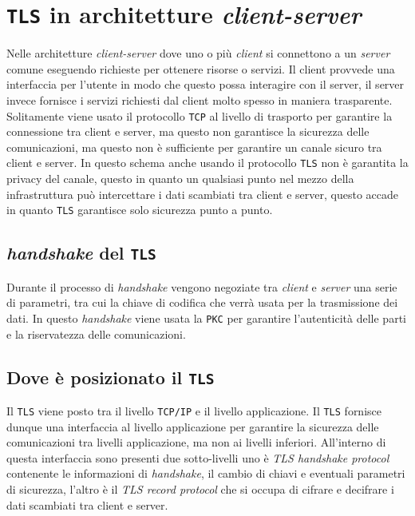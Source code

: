\section{\texttt{TLS} in architetture \textit{client-server}}
    Nelle architetture \textit{client-server} dove uno o più \textit{client} si connettono a un \textit{server} comune eseguendo richieste per ottenere risorse o servizi. Il client provvede una interfaccia per l'utente in modo che questo possa interagire con il server, il server invece fornisce i servizi richiesti dal client molto spesso in maniera trasparente. Solitamente viene usato il protocollo \texttt{TCP} al livello di trasporto per garantire la connessione tra client e server, ma questo non garantisce la sicurezza delle comunicazioni, ma questo non è sufficiente per garantire un canale sicuro tra client e server. In questo schema anche usando il protocollo \texttt{TLS} non è garantita la privacy del canale, questo in quanto un qualsiasi punto nel mezzo della infrastruttura può intercettare i dati scambiati tra client e server, questo accade in quanto \texttt{TLS} garantisce solo sicurezza punto a punto.

    \subsection{\textit{handshake} del \texttt{TLS}}
        Durante il processo di \textit{handshake} vengono negoziate tra \textit{client} e \textit{server} una serie di parametri, tra cui la chiave di codifica che verrà usata per la trasmissione dei dati. In questo \textit{handshake} viene usata la \texttt{PKC} per garantire l'autenticità delle parti e la riservatezza delle comunicazioni. 
    
    \subsection{Dove è posizionato il \texttt{TLS}}
        Il \texttt{TLS} viene posto tra il livello \texttt{TCP/IP} e il livello applicazione. Il \texttt{TLS} fornisce dunque una interfaccia al livello applicazione per garantire la sicurezza delle comunicazioni tra livelli applicazione, ma non ai livelli inferiori. All'interno di questa interfaccia sono presenti due sotto-livelli uno è \textit{TLS handshake protocol} contenente le informazioni di \textit{handshake}, il cambio di chiavi e eventuali parametri di sicurezza, l'altro è il \textit{TLS record protocol} che si occupa di cifrare e decifrare i dati scambiati tra client e server.
